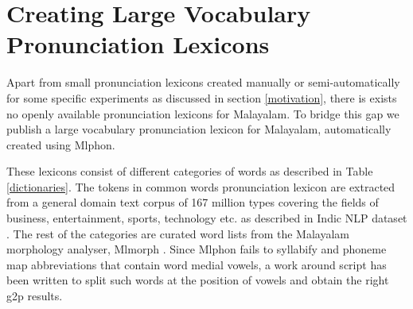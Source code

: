 \documentclass{ieeeaccess}
\begin{document}




\section{Creating Large Vocabulary Pronunciation Lexicons}
\label{pronunciationdictionary}

Apart from small pronunciation lexicons created manually or semi-automatically for some specific experiments as discussed in section \ref{motivation},  there is exists no openly available pronunciation lexicons for Malayalam. To bridge this gap we publish a large vocabulary pronunciation lexicon for Malayalam, automatically created using Mlphon. 


These lexicons consist of different categories of words as described in Table \ref{dictionaries}. The tokens in common words pronunciation lexicon are extracted from a general domain text corpus of 167 million types covering the fields of business, entertainment, sports, technology etc. as described in Indic NLP dataset \cite{kunchukuttan2020ai4bharat}. The rest of the categories are curated word lists from the Malayalam morphology analyser, Mlmorph \cite{thottingal-2019-finite}. Since Mlphon fails to syllabify and phoneme map abbreviations that contain word medial vowels, a work around script has been written to split such words at the position of vowels and obtain the right g2p results. 
\end{document}
